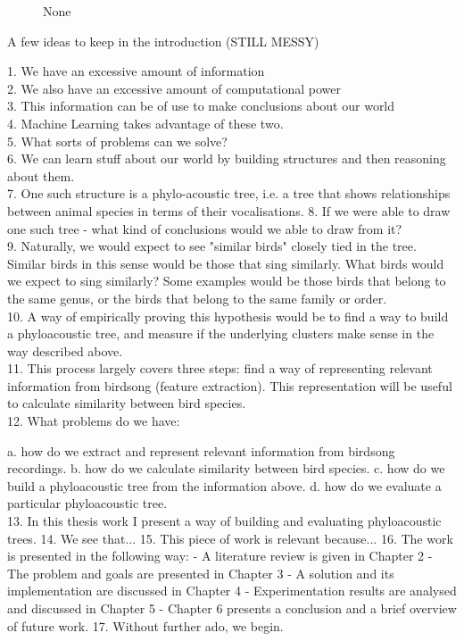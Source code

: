 \documentclass[../main.tex]{subfiles}
\begin{document}
\begin{figure}[bh]
\centering
 
\label{fig:img1}
\caption{None}
\end{figure}
A few ideas to keep in the introduction (STILL MESSY)

1. We have an excessive amount of information\\
2. We also have an excessive amount of computational power\\
3. This information can be of use to make conclusions about our world\\
4. Machine Learning takes advantage of these two.\\
5. What sorts of problems can we solve? \\
6. We can learn stuff about our world by building structures and then reasoning about them. \\
7. One such structure is a phylo-acoustic tree, i.e. a tree that shows relationships between animal species in terms of their vocalisations. 
8. If we were able to draw one such tree - what kind of conclusions would we able to draw from it? \\
9. Naturally, we would expect to see "similar birds" closely tied in the tree. Similar birds in this sense would be those that sing similarly. What birds would we expect to sing similarly? Some examples would be those birds that belong to the same genus, or the birds that belong to the same family or order. \\
10. A way of empirically proving this hypothesis would be to find a way to build a phyloacoustic tree, and measure if the underlying clusters make sense in the way described above.\\
11. This process largely covers three steps: find a way of representing relevant information from birdsong (feature extraction). This representation will be useful to calculate similarity between bird species. \\
12. What problems do we have:

a. how do we extract and represent relevant information from birdsong recordings.
b. how do we calculate similarity between bird species.
c. how do we build a phyloacoustic tree from the information above.
d. how do we evaluate a particular phyloacoustic tree.\\
13. In this thesis work I present a way of building and evaluating phyloacoustic trees. 
14. We see that...
15. This piece of work is relevant because...
16. The work is presented in the following way:
- A literature review is given in Chapter 2
- The problem and goals are presented in Chapter 3
- A solution and its implementation are discussed in Chapter 4
- Experimentation results are analysed and discussed in Chapter 5
- Chapter 6 presents a conclusion and a brief overview of future work.
17. Without further ado, we begin. \cite{Awatade2012}
\end{document}
